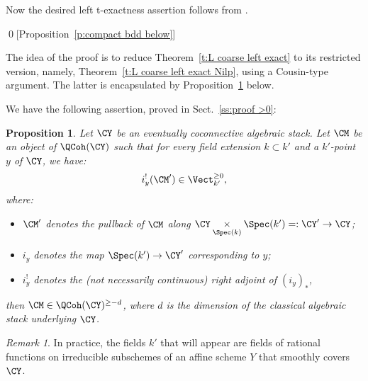 \documentclass[9pt]{amsart}
\newtheorem{prop}[subsubsection]{Proposition}
\theoremstyle{remark}
\newtheorem{rem}[subsubsection]{Remark}
\theoremstyle{definition}
\theoremstyle{remark}
\newcommand{\thmref}[1]{Theorem~\ref{#1}}
\newcommand{\secref}[1]{Sect.~\ref{#1}}
\newcommand{\propref}[1]{Proposition~\ref{#1}}
\numberwithin{equation}{section}
\begin{document}
\medskip

Now the desired left t-exactness assertion follows from \cite[Theorem 3.4.1]{Ra}. 

\qed[\propref{p:compact bdd below}]

\ssec{Proof of \thmref{t:L coarse left exact}}

The idea of the proof is to reduce \thmref{t:L coarse left exact} to its restricted version, namely, \thmref{t:L coarse left exact Nilp},
using a Cousin-type argument. The latter is encapsulated by \propref{p:when >0} below. 

\sssec{}

We have the following assertion, proved in \secref{ss:proof >0}: 

\begin{prop} \label{p:when >0}
Let $\CY$ be an eventually coconnective algebraic stack. Let 
$\CM$ be an object of $\QCoh(\CY)$ such that for every field extension $k\subset k'$ and a $k'$-point $y$ of $\CY$, we have:
$$i_y^!(\CM')\in \Vect_{k'}^{\geq 0},$$
where:

\begin{itemize}

\item $\CM'$ denotes the pullback of $\CM$ along $\CY\underset{\Spec(k)}\times \Spec(k')=:\CY'\to \CY$;

\item $i_y$ denotes the map $\Spec(k')\to \CY'$ corresponding to $y$;

\smallskip

\item $i_y^!$ denotes the (not necessarily continuous) right adjoint of $(i_y)_*$,

\end{itemize}

\smallskip

\noindent then $\CM\in \QCoh(\CY)^{\geq -d}$,
where $d$ is the dimension of the classical algebraic stack underlying $\CY$. 

\end{prop}

\begin{rem}
In practice, the fields $k'$ that will appear are fields of rational functions
on irreducible subschemes of an affine scheme $Y$ that smoothly covers $\CY$.
\end{rem}


\sssec{} \label{sss:red to rat}
\end{document}
